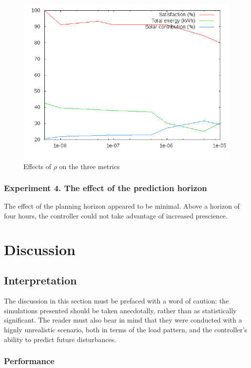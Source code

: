 \begin{figure}
   \centering
   \includegraphics[width=12cm]{images/rho-graphs}
   \caption{Effects of $\rho$ on the three metrics}
   \label{fig:rho-graphs}
\end{figure}

\subsubsection{Experiment 4. The effect of the prediction horizon}

The effect of the planning horizon appeared to be minimal.
Above a horizon of four hours, the controller could not take advantage of increased prescience.

\section{Discussion}

\subsection{Interpretation}

The discussion in this section must be prefaced with a word of caution: the simulations presented should be taken anecdotally, rather than as statistically significant.
The reader must also bear in mind that they were conducted with a hignly unrealistic scenario, both in terms of the load pattern, and the controller's ability to predict future disturbances.

\subsubsection{Performance}

